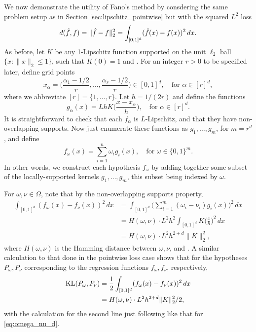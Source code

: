 \documentclass{article}
\begin{document}
We now demonstrate the utility of Fano's method by consdering the same problem
setup as in Section \ref{sec:lipschitz_pointwise} but with the squared $L^2$ loss 
\[
d(\hat{f}, f) = \|\hat{f} - f\|_2^2 = \int_{[0,1]^d} (\hat{f}(x) - f(x))^2 \, dx. 
\]
As before, let $K$ be any 1-Lipschitz function supported on the unit $\ell_2$
ball $\{ x : \|x\|_2 \leq 1 \}$, such that $K(0) = 1$ and  . For an integer $r > 0$ to be specified later, define
grid points  
\[
x_\alpha = \bigg( \frac{\alpha_1-1/2}{r}, \dots, \frac{\alpha_r-1/2}{r} \bigg)
\in [0,1]^d, \quad \text{for $\alpha \in [r]^d$}, 
\]
where we abbreviate $[r] = \{1,\dots,r\}$. Let $h=1/(2r)$ and define the functions 
\[
g_\alpha(x) = Lh K \bigg( \frac{x - x_\alpha}{h} \bigg), \quad \text{for $\alpha
  \in [r]^d$}.
\]
It is straightforward to check that each $f_\alpha$ is $L$-Lipschitz, and that
they have non-overlapping supports. Now just enumerate these functions as
$g_1,\dots,g_m$, for $m = r^d$, and define  
\[
f_\omega(x) = \sum_{i=1}^n \omega_i g_i(x), \quad \text{for $\omega \in
  \{0,1\}^m$}.  
\]
In other words, we construct each hypothesis $f_\omega$ by adding together some
subset of the locally-supported kernels $g_1,\dots,g_m$, this subset being
indexed by $\omega$. 

For $\omega,\nu \in \Omega$, note that by the non-overlapping supports property, 
\begin{align}
\nonumber
\int_{[0,1]^d} (f_\omega(x) - f_\nu(x))^2 \, dx
&= \int_{[0,1]^d} \bigg( \sum_{i=1}^m (\omega_i - \nu_i) g_i(x) \bigg)^2 \, dx
  \\    
\nonumber
&= H(\omega, \nu) \cdot L^2 h^2 \int_{[0,1]^d} K \bigg( \frac{x}{h} \bigg)^2 \,
  dx \\ 
\label{eq:omega_nu_d}
&= H(\omega, \nu) \cdot L^2 h^{2+d} \|K\|_2^2,
\end{align}
where $H(\omega, \nu)$ is the Hamming distance between $\omega,\nu$, and  
. A similar calculation to that done in
the pointwise loss case shows that for the hypotheses $P_\omega,P_\nu$
corresponding to the regression functions $f_\omega,f_\nu$, respectively,  
\begin{align}
\nonumber
\mathrm{KL}(P_\omega,P_\nu) 
&= \frac{1}{2} \int_{[0,1]^d} (f_\omega(x) - f_\nu(x))^2 \, dx \\ 
\label{eq:omega_nu_kl}
&= H(\omega, \nu) \cdot L^2 h^{2+d} \|K\|_2^2 / 2,
\end{align}
with the calculation for the second line just following like that for
\eqref{eq:omega_nu_d}.  
\end{document}
